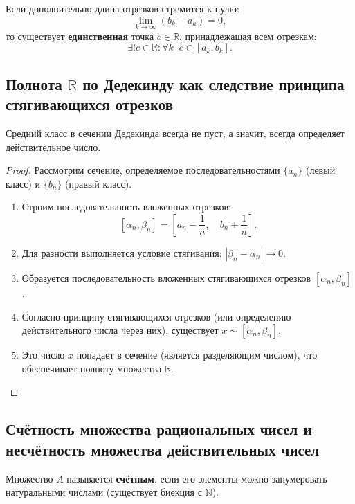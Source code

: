 \begin{consequence}
    Если дополнительно длина отрезков стремится к нулю:
    \[ \lim_{k\to\infty} (b_k - a_k) = 0, \]
    то существует \textbf{единственная} точка $c \in \mathbb{R}$, принадлежащая всем отрезкам:
    \[ \exists! c \in \mathbb{R}: \forall k \;\; c \in [a_k, b_k]. \]
\end{consequence}

\subsection{Полнота $\mathbb{R}$ по Дедекинду как следствие принципа стягивающихся отрезков}

\begin{statement}
    Средний класс в сечении Дедекинда всегда не пуст, а значит, всегда определяет действительное число.
\end{statement}

\begin{proof}
    Рассмотрим сечение, определяемое последовательностями $\{a_n\}$ (левый класс) и $\{b_n\}$ (правый класс).
    \begin{enumerate}
        \item Строим последовательность вложенных отрезков:
        \[ [\alpha_n, \beta_n] = \left[ a_n - \frac{1}{n}, \quad b_n + \frac{1}{n} \right]. \]
        \item Для разности выполняется условие стягивания: $|\beta_n - \alpha_n| \to 0$.
        \item Образуется последовательность вложенных стягивающихся отрезков $[\alpha_n, \beta_n]$.
        \item Согласно принципу стягивающихся отрезков (или определению действительного числа через них), существует $x \sim [\alpha_n, \beta_n]$.
        \item Это число $x$ попадает в сечение (является разделяющим числом), что обеспечивает полноту множества $\mathbb{R}$.
    \end{enumerate}
\end{proof}

\subsection{Счётность множества рациональных чисел и несчётность множества действительных чисел}

\begin{definition}
    Множество $A$ называется \textbf{счётным}, если его элементы можно занумеровать натуральными числами (существует биекция с $\mathbb{N}$).
\end{definition}

